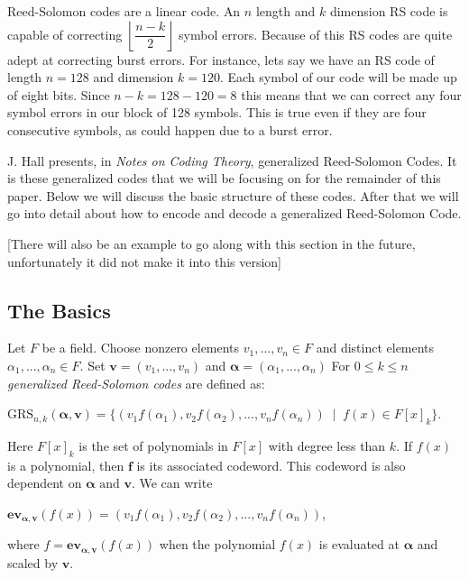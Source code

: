 \documentclass{article}
\begin{document}
Reed-Solomon codes are a linear code. An $n$ length and $k$ dimension RS code is capable of correcting $\left \lfloor{\dfrac{n - k}{2}}\right \rfloor$ symbol errors. Because of this RS codes are quite adept at correcting burst errors. For instance, lets say we have an RS code of length $n = 128$ and dimension $k = 120$. Each symbol of our code will be made up of eight bits. Since $n - k = 128 - 120 = 8$ this means that we can correct any four symbol errors in our block of 128 symbols. This is true even if they are four consecutive symbols, as could happen due to a burst error.

J. Hall presents, in \textit{Notes on Coding Theory}, generalized Reed-Solomon Codes. It is these generalized codes that we will be focusing on for the remainder of this paper. Below we will discuss the basic structure of these codes. After that we will go into detail about how to encode and decode a generalized Reed-Solomon Code.

[There will also be an example to go along with this section in the future, unfortunately it did not make it into this version] 

\subsection{The Basics}
Let $F$ be a field. Choose nonzero elements $v_{1},..., v_{n} \in F$ and distinct elements $\alpha_{1},...,\alpha_{n} \in F$. Set $\textbf{v} = (v_{1},..., v_{n})$ and $\boldsymbol\alpha = (\alpha_{1},...,\alpha_{n})$ For $0 \le k \le n$ \textit{generalized Reed-Solomon codes} are defined as:
\begin{center}
$\text{GRS}_{n,k}(\boldsymbol\alpha, \textbf{v}) = \{(v_{1}f(\alpha_{1}),v_{2}f(\alpha_{2}),...,v_{n}f(\alpha_{n}))\;\mid\;f(x) \in F[x]_{k}\}$.
\end{center}
Here $F[x]_{k}$ is the set of polynomials in $F[x]$ with degree less than $k$. If $f(x)$ is a polynomial, then $\textbf{f}$ is its associated codeword. This codeword is also dependent on $\boldsymbol\alpha \text{ and } \textbf{v}$. We can write

\begin{center}
$\textbf{ev}_{\boldsymbol\alpha,\textbf{v}}(f(x)) = (v_{1}f(\alpha_{1}),v_{2}f(\alpha_{2}),...,v_{n}f(\alpha_{n}))$,
\end{center}
where $f = \textbf{ev}_{\boldsymbol\alpha,\textbf{v}}(f(x))$ when the polynomial $f(x)$ is evaluated at $\boldsymbol\alpha$ and scaled by $\textbf{v}$.
\end{document}
